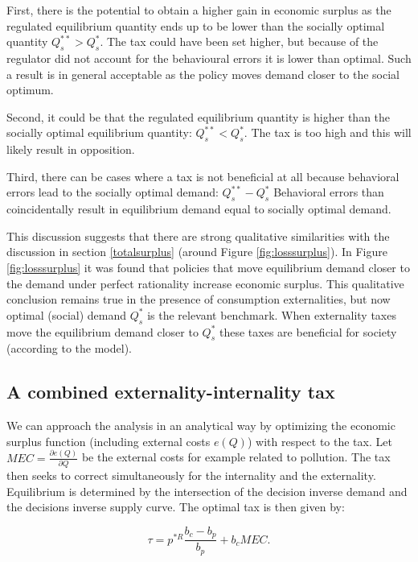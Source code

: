 \documentclass[
]{book}
\begin{document}
First, there is the potential to obtain a higher gain in economic surplus as the regulated equilibrium quantity ends up to be lower than the socially optimal quantity \(Q_s^{**} >Q_s^*\). The tax could have been set higher, but because of the regulator did not account for the behavioural errors it is lower than optimal. Such a result is in general acceptable as the policy moves demand closer to the social optimum.

Second, it could be that the regulated equilibrium quantity is higher than the socially optimal equilibrium quantity: \(Q_s^{**} <Q_s^*\). The tax is too high and this will likely result in opposition.

Third, there can be cases where a tax is not beneficial at all because behavioral errors lead to the socially optimal demand: \(Q_s^{**} - Q_s^*\) Behavioral errors than coincidentally result in equilibrium demand equal to socially optimal demand.

This discussion suggests that there are strong qualitative similarities with the discussion in section \ref{totalsurplus} (around Figure \ref{fig:losssurplus}). In Figure \ref{fig:losssurplus} it was found that policies that move equilibrium demand closer to the demand under perfect rationality increase economic surplus. This qualitative conclusion remains true in the presence of consumption externalities, but now optimal (social) demand \(Q_s^*\) is the relevant benchmark. When externality taxes move the equilibrium demand closer to \(Q_s^*\) these taxes are beneficial for society (according to the model).

\hypertarget{a-combined-externality-internality-tax}{%
\subsection{A combined externality-internality tax}\label{a-combined-externality-internality-tax}}

We can approach the analysis in an analytical way by optimizing the economic surplus function (including external costs \(e(Q)\)) with respect to the tax. Let \(MEC=\frac{\partial e(Q)}{\partial Q}\) be the external costs for example related to pollution. The tax then seeks to correct simultaneously for the internality and the externality. Equilibrium is determined by the intersection of the decision inverse demand and the decisions inverse supply curve. The optimal tax is then given by:

\begin{equation}
\tau = p^{*R} \frac{b_c - b_p}{b_p} +b_c MEC.
\end{equation}
\end{document}

